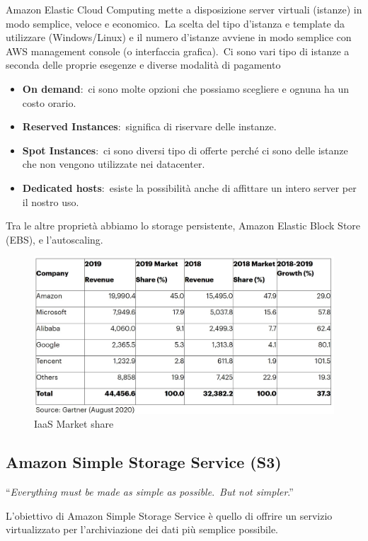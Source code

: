 Amazon Elastic Cloud Computing mette a disposizione server virtuali (istanze) in modo semplice, veloce e economico.\
La scelta del tipo d'istanza e template da utilizzare (Windows/Linux) e il numero d'istanze avviene in modo semplice con AWS management console (o interfaccia grafica).\
Ci sono vari tipo di istanze a seconda delle proprie esegenze e diverse modalità di pagamento
\begin{itemize}
    \item \textbf{On demand}:\ ci sono molte opzioni che possiamo scegliere e ognuna ha un costo orario.
    \item \textbf{Reserved Instances}:\ significa di riservare delle instanze.
    \item \textbf{Spot Instances}:\ ci sono diversi tipo di offerte perché ci sono delle istanze che non vengono utilizzate nei datacenter.
    \item \textbf{Dedicated hosts}:\ esiste la possibilità anche di affittare un intero server per il nostro uso.
\end{itemize}
Tra le altre proprietà abbiamo lo storage persistente, Amazon Elastic Block Store (EBS), e l'autoscaling.

\begin{figure}[H]
    \centering
    \includegraphics[width=\textwidth]{immagini/MarketShare.jpg}
    \caption*{IaaS Market share}
\end{figure}

\subsection{Amazon Simple Storage Service (S3)}
\begin{center}
    ``\textit{Everything must be made as simple as possible}.\
    \textit{But not simpler}.''
\end{center}
L'obiettivo di Amazon Simple Storage Service è quello di offrire un servizio virtualizzato per l'archiviazione dei dati più semplice possibile.\

